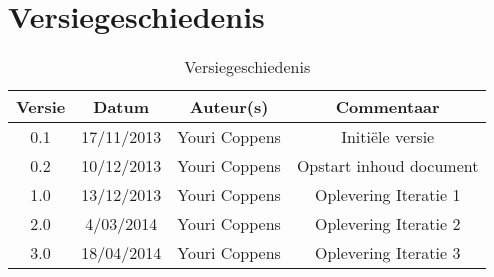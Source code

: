 \chapter{Versiegeschiedenis}

\begin{table}[htbp]
	\centering
	\begin{tabular} {|c|c|c|c|}
	    \hline
		\textbf{Versie} & \textbf{Datum} 	& \textbf{Auteur(s)} & \textbf{Commentaar} \\
		\hline
		0.1	& 17/11/2013	& Youri Coppens	& Initi\"{e}le versie\\
		\hline
		0.2	& 10/12/2013	& Youri Coppens	& Opstart inhoud document\\
		\hline
		1.0	& 13/12/2013	& Youri Coppens	& Oplevering Iteratie 1\\ 
		\hline
		2.0	& 4/03/2014	& Youri Coppens	& Oplevering Iteratie 2\\
		\hline
		3.0	& 18/04/2014	& Youri Coppens	& Oplevering Iteratie 3\\
		\hline
	\end{tabular}
	\caption{Versiegeschiedenis}
\end{table}